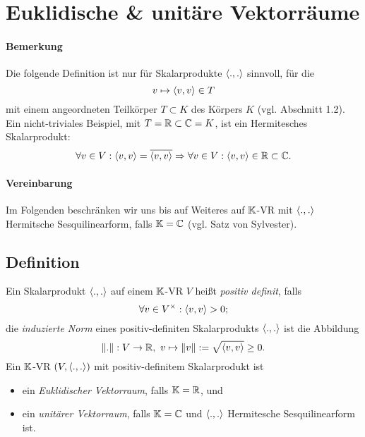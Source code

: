 \section{Euklidische \& unitäre Vektorräume}


\paragraph{Bemerkung}
	Die folgende Definition ist nur für Skalarprodukte $ \langle .,. \rangle $ sinnvoll, für die
		\[ v\mapsto \langle  v,v \rangle \in T \]
	mit einem angeordneten Teilkörper $ T \subset K $ des Körpers $ K $ (vgl. Abschnitt 1.2).
	Ein nicht-triviales Beispiel, mit $ T=\mathbb{R}\subset \mathbb{C} = K $, ist ein Hermitesches Skalarprodukt:
		\[ \forall v\in V: \langle  v,v \rangle = \overline{\langle  v,v \rangle} \Rightarrow \forall v\in V: \langle  v,v \rangle \in \mathbb{R}\subset \mathbb{C}. \]
\paragraph{Vereinbarung}
	Im Folgenden beschränken wir uns bis auf Weiteres auf $ \mathbb{K} $-VR mit $ \langle .,. \rangle $ Hermitsche Sesquilinearform, falls $ \mathbb{K} = \mathbb{C} $ (vgl. Satz von Sylvester).
	
\subsection{Definition}   
\begin{Definition}
	Ein Skalarprodukt $ \langle .,. \rangle $ auf einem $ \mathbb{K} $-VR $ V $ heißt \emph{positiv definit}, falls
		\[ \forall v\in V^\times:\langle  v,v \rangle >0; \]
	die \emph{induzierte Norm} eines positiv-definiten Skalarprodukts $ \langle .,. \rangle $ ist die Abbildung
		\[ \|.\|: V\to \mathbb{R},\ v\mapsto \|v\| := \sqrt{\langle  v,v \rangle}\geq 0. \]
	Ein $ \mathbb{K} $-VR $ (V,\langle .,. \rangle ) $ mit positiv-definitem Skalarprodukt ist
		\begin{itemize}
			\item ein \emph{Euklidischer Vektorraum}, falls $ \mathbb{K}=\mathbb{R} $, und
			\item ein \emph{unitärer Vektorraum}, falls $ \mathbb{K} = \mathbb{C} $ und $ \langle .,. \rangle $ Hermitesche Sesquilinearform ist. 
		\end{itemize}
\end{Definition}

